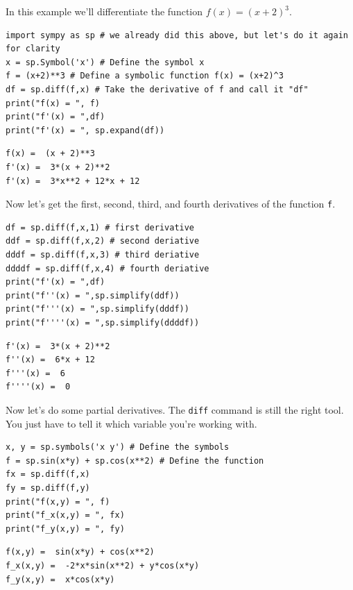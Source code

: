 \begin{example}
    In this example we'll differentiate the function $f(x) = (x+2)^3$.

\bcode
\begin{lstlisting}
import sympy as sp # we already did this above, but let's do it again for clarity
x = sp.Symbol('x') # Define the symbol x
f = (x+2)**3 # Define a symbolic function f(x) = (x+2)^3
df = sp.diff(f,x) # Take the derivative of f and call it "df"
print("f(x) = ", f)
print("f'(x) = ",df)
print("f'(x) = ", sp.expand(df))
\end{lstlisting}
\boutput
\begin{lstlisting}
f(x) =  (x + 2)**3
f'(x) =  3*(x + 2)**2
f'(x) =  3*x**2 + 12*x + 12
\end{lstlisting}

Now let's get the first, second, third, and fourth derivatives of the function \texttt{f}.

\bcode
\begin{lstlisting}
df = sp.diff(f,x,1) # first derivative
ddf = sp.diff(f,x,2) # second deriative
dddf = sp.diff(f,x,3) # third deriative
ddddf = sp.diff(f,x,4) # fourth deriative
print("f'(x) = ",df)
print("f''(x) = ",sp.simplify(ddf))
print("f'''(x) = ",sp.simplify(dddf))
print("f''''(x) = ",sp.simplify(ddddf))
\end{lstlisting}
\boutput
\begin{lstlisting}
f'(x) =  3*(x + 2)**2
f''(x) =  6*x + 12
f'''(x) =  6
f''''(x) =  0
\end{lstlisting}
\end{example}

\begin{example}
    Now let's do some partial derivatives.  The \texttt{diff} command is still the right
    tool.  You just have to tell it which variable you're working with.

\bcode
\begin{lstlisting}
x, y = sp.symbols('x y') # Define the symbols
f = sp.sin(x*y) + sp.cos(x**2) # Define the function
fx = sp.diff(f,x)
fy = sp.diff(f,y)
print("f(x,y) = ", f)
print("f_x(x,y) = ", fx)
print("f_y(x,y) = ", fy)
\end{lstlisting}
\boutput
\begin{lstlisting}
f(x,y) =  sin(x*y) + cos(x**2)
f_x(x,y) =  -2*x*sin(x**2) + y*cos(x*y)
f_y(x,y) =  x*cos(x*y)
\end{lstlisting}
\end{example}

